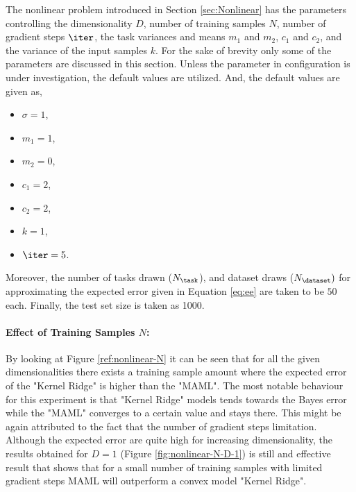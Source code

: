 The nonlinear problem introduced in Section \ref{sec:Nonlinear} has the parameters controlling the dimensionality $D$, number of training samples $N$, number of gradient steps $\iter$, the task variances and means $m_1$ and $m_2$, $c_1$ and $c_2$, and the variance of the input samples $k$. For the sake of brevity only some of the parameters are discussed in this section. Unless the parameter in configuration is under investigation, the default values are utilized. And, the default values are given as,
\begin{itemize}
  \item $\sigma=1$,
  \item $m_1=1$,
  \item $m_2=0$,
  \item $c_1=2$,
  \item $c_2=2$,
  \item $k=1$,
  \item $\iter=5$.
\end{itemize}
Moreover, the number of tasks drawn ($N_{\task}$), and dataset draws ($N_{\dataset})$  for approximating the expected error given in Equation \ref{eq:ee} are taken to be $50$ each. Finally, the test set size is taken as 1000.

\paragraph{Effect of Training Samples $N$:} By looking at Figure \ref{ref:nonlinear-N} it can be seen that for all the given dimensionalities there exists a training sample amount where the expected error of the "Kernel Ridge" is higher than the "MAML". The most notable behaviour for this experiment is that "Kernel Ridge" models tends towards the Bayes error while the "MAML" converges to a certain value and stays there. This might be again attributed to the fact that the number of gradient steps limitation. Although the expected error are quite high for increasing dimensionality, the results obtained for $D=1$ (Figure \ref{fig:nonlinear-N-D-1}) is still and effective result that shows that for a small number of training samples with limited gradient steps MAML will outperform a convex model "Kernel Ridge".

